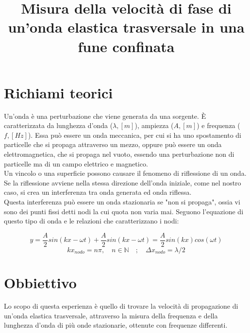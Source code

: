 \documentclass[12pt, a4paper]{article}
\title{\textbf{Misura della velocità di fase di un’onda
elastica trasversale in una fune confinata}}
\date{}
\begin{document}
\maketitle
{}%



\section{Richiami teorici}
Un'onda è una perturbazione che viene generata da una sorgente. È caratterizzata da lunghezza d'onda ($\lambda, [m]$), ampiezza ($A, [m]$) e frequenza ($f, [Hz]$).
Essa può essere un onda meccanica, per cui si ha uno spostamento di particelle che si propaga attraverso un mezzo, oppure può essere un onda elettromagnetica, che si propaga nel vuoto, essendo una perturbazione non di particelle ma di un campo elettrico e magnetico.\\

Un vincolo o una superficie possono causare il fenomeno di riflessione di un onda. 
Se la riflessione avviene nella stessa direzione dell'onda iniziale, come nel nostro caso, si crea un interferenza tra onda generata ed onda riflessa.\\

Questa interferenza può essere un onda stazionaria se "non si propaga", ossia vi sono dei punti fissi detti nodi la cui quota non varia mai. 
Seguono l'equazione di questo tipo di onda e le relazioni che caratterizzano i nodi:

\begin{equation*}
    y = \frac{A}{2} sin(kx - \omega t) + \frac{A}{2} sin(kx - \omega t) = \frac{A}{2} sin(kx)cos(\omega t)
\end{equation*}
\begin{equation*}
    k x_{nodo} = n\pi, \quad n \in \mathbb{N}  \quad ; \quad \Delta x_{nodo} = \lambda /2
\end{equation*}




\section{Obbiettivo}
Lo scopo di questa esperienza è quello di trovare la velocità di propagazione di un'onda elastica trasversale, attraverso la misura della frequenza e della lunghezza d'onda di più onde stazionarie, ottenute con frequenze differenti.\\
\end{document}
